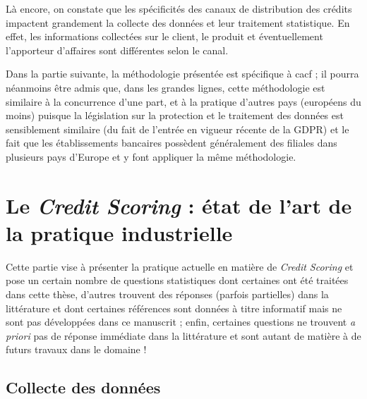Là encore, on constate que les spécificités des canaux de distribution des crédits impactent grandement la collecte des données et leur traitement statistique. En effet, les informations collectées sur le client, le produit et éventuellement l'apporteur d'affaires sont différentes selon le canal.

Dans la partie suivante, la méthodologie présentée est spécifique à \gls{cacf} ; il pourra néanmoins être admis que, dans les grandes lignes, cette méthodologie est similaire à la concurrence d'une part, et à la pratique d'autres pays (européens du moins) puisque la législation sur la protection et le traitement des données est sensiblement similaire (du fait de l'entrée en vigueur récente de la GDPR) et le fait que les établissements bancaires possèdent généralement des filiales dans plusieurs pays d'Europe et y font appliquer la même méthodologie.


\section{Le \textit{Credit Scoring} : état de l'art de la pratique industrielle} \label{chap1:sec2}

Cette partie vise à présenter la pratique actuelle en matière de \textit{Credit Scoring} et pose un certain nombre de questions statistiques dont certaines ont été traitées dans cette thèse, d'autres trouvent des réponses (parfois partielles) dans la littérature et dont certaines références sont données à titre informatif mais ne sont pas développées dans ce manuscrit ; enfin, certaines questions ne trouvent \textit{a priori} pas de réponse immédiate dans la littérature et sont autant de matière à de futurs travaux dans le domaine !

\subsection{Collecte des données}

